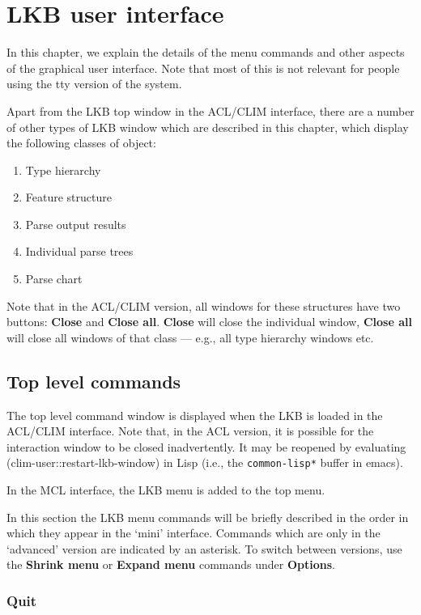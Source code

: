 \documentclass[12pt]{report}
\begin{document}
\chapter{LKB user interface}
\label{ui}

In this chapter, we explain the details of the menu commands
and other aspects of the graphical user interface.
Note that most of this is not relevant for people using the tty version
of the system.

Apart from the LKB top window in the ACL/CLIM interface, there are
a number of other types of LKB window which are described in this chapter,
which display the following classes of object:
\begin{enumerate}
\item Type hierarchy
\item Feature structure 
\item Parse output results
\item Individual parse trees
\item Parse chart
\end{enumerate}
Note that in the ACL/CLIM version, all windows for these structures
have two buttons: {\bf Close} and {\bf Close all}.
{\bf Close} will close the individual window, {\bf Close all}
will close all windows of that class --- e.g., all type hierarchy windows
etc.

\section{Top level commands}

The top level command window is displayed when the LKB is loaded
in the ACL/CLIM interface.
Note that, in the ACL version, it is possible for the interaction
window to be closed inadvertently.
It may be reopened by evaluating
(clim-user::restart-lkb-window) in Lisp (i.e., the
{\tt *common-lisp*} buffer in emacs).

In the MCL interface, the LKB menu is added to the top menu.

In this section the LKB menu
commands will be briefly described in the order in
which they appear in the `mini' interface.
Commands which are only in the `advanced' version are indicated by
an asterisk.  To switch between versions, use the {\bf Shrink menu}
or {\bf Expand menu} commands under {\bf Options}.

\subsection{Quit}
\end{document}
